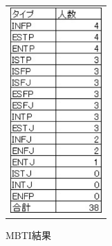 \documentclass[uplatex]{jsarticle}
\begin{document}
\begin{figure}[h]
   \begin{tabular}{c}

      \begin{minipage}{0.33\hsize}
        \begin{center}
   \includegraphics[width=3.5cm,clip]{wariai.pdf}
  \caption{MBTI結果}
  \label{wariai}
  \end{center}
 \end{minipage}


\end{tabular}
\end{figure}
\end{document}

